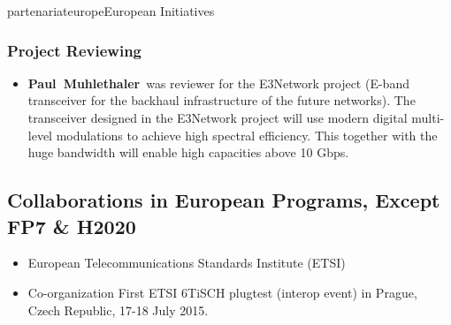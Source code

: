 \documentclass{ra2016}
\newcommand{\paul}  {\textbf{Paul~Muhlethaler}}
\begin{document}
\begin{module}{partenariat}{europe}{European Initiatives}
%
\subsubsection{Project Reviewing} 

\begin{itemize}
    \item \paul~was reviewer for the E3Network project  (E-band transceiver for the backhaul infrastructure of the future networks). The transceiver designed in the E3Network project will use modern digital multi-level modulations to achieve high spectral efficiency. This together with the huge bandwidth will enable high capacities above 10 Gbps.
\end{itemize}




\subsection{Collaborations in European Programs, Except FP7 \& H2020}
\begin{itemize}
    \item European Telecommunications Standards Institute (ETSI)
    \item Co-organization First ETSI 6TiSCH plugtest (interop event) in Prague, Czech Republic, 17-18 July 2015.
\end{itemize}



\end{module}
\end{document}
